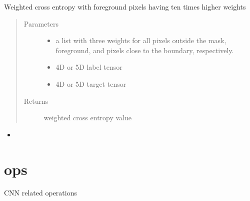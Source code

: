 \documentclass[letterpaper,10pt,english]{sphinxmanual}
\begin{document}
\begin{fulllineitems}
\label{\detokenize{index:unet.loss.weighted_cross_entropy_with_boundary_fun}}
Weighted cross entropy with foreground pixels having ten times higher weights
\begin{quote}\begin{description}
\item[{Parameters}] \leavevmode\begin{itemize}
\item {} 
 \textendash{} a list with three weights for all pixels outside the mask, foreground, and pixels close to the
boundary, respectively.

\item {} 
 \textendash{} 4D or 5D label tensor

\item {} 
 \textendash{} 4D or 5D target tensor

\end{itemize}

\item[{Returns}] \leavevmode
weighted cross entropy value

\end{description}\end{quote}



\begin{itemize}
\item {} 
{\hyperref[\detokenize{index:unet.loss.mask_boundary_neighborhood}]{}}

\end{itemize}



\end{fulllineitems}



\section{ops}
\label{\detokenize{index:module-unet.ops}}\label{\detokenize{index:ops}}
CNN related operations
\end{document}

